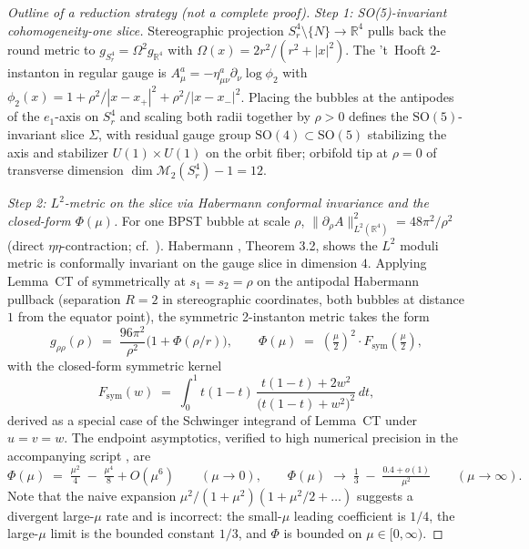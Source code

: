 \documentclass[11pt,letterpaper]{article}
\theoremstyle{definition}
\newcommand{\bbR}{\mathbb{R}}
\newcommand{\cM}{\mathcal{M}}
\begin{document}
\begin{proof}[Outline of a reduction strategy (not a complete proof)]
\emph{Step 1: SO(5)-invariant cohomogeneity-one slice.} Stereographic projection $S^4_r \setminus\{N\} \to \bbR^4$ pulls back the round metric to $g_{S^4_r} = \Omega^2 g_{\bbR^4}$ with $\Omega(x) = 2r^2/(r^2 + |x|^2)$. The 't~Hooft 2-instanton in regular gauge is $A^a_\mu = -\eta^a_{\mu\nu}\partial_\nu \log \phi_2$ with $\phi_2(x) = 1 + \rho^2/|x - x_+|^2 + \rho^2/|x - x_-|^2$. Placing the bubbles at the antipodes of the $e_1$-axis on $S^4_r$ and scaling both radii together by $\rho > 0$ defines the $\mathrm{SO}(5)$-invariant slice $\Sigma$, with residual gauge group $\mathrm{SO}(4) \subset \mathrm{SO}(5)$ stabilizing the axis and stabilizer $U(1) \times U(1)$ on the orbit fiber; orbifold tip at $\rho = 0$ of transverse dimension $\dim\cM_2(S^4_r) - 1 = 12$.

\emph{Step 2: $L^2$-metric on the slice via Habermann conformal invariance and the closed-form $\Phi(\mu)$.} For one BPST bubble at scale $\rho$, $\|\partial_\rho A\|^2_{L^2(\bbR^4)} = 48\pi^2/\rho^2$ (direct $\eta\eta$-contraction; cf.\ \cite{DK1990}). Habermann \cite{Habermann1993}, Theorem 3.2, shows the $L^2$ moduli metric is conformally invariant on the gauge slice in dimension $4$. Applying Lemma~CT of \cite{bonfioli-core} symmetrically at $s_1 = s_2 = \rho$ on the antipodal Habermann pullback (separation $R = 2$ in stereographic coordinates, both bubbles at distance $1$ from the equator point), the symmetric 2-instanton metric takes the form
\[
g_{\rho\rho}(\rho) \;=\; \frac{96\pi^2}{\rho^2}\bigl(1 + \Phi(\rho/r)\bigr),\qquad \Phi(\mu) \;=\; \left(\tfrac{\mu}{2}\right)^2 \cdot F_{\mathrm{sym}}\!\left(\tfrac{\mu}{2}\right),
\]
with the closed-form symmetric kernel
\[
F_{\mathrm{sym}}(w) \;=\; \int_0^1 t(1-t)\,\frac{t(1-t) + 2w^2}{\bigl(t(1-t) + w^2\bigr)^2}\,dt,
\]
derived as a special case of the Schwinger integrand of Lemma~CT under $u=v=w$. The endpoint asymptotics, verified to high numerical precision in the accompanying script \cite{m2-closure-higher-order}, are
\[
\Phi(\mu) \;=\; \tfrac{\mu^2}{4} \;-\; \tfrac{\mu^4}{8} + O(\mu^6)\qquad (\mu \to 0),\qquad
\Phi(\mu) \;\to\; \tfrac{1}{3}\;-\;\tfrac{0.4 + o(1)}{\mu^2}\qquad (\mu \to \infty).
\]
Note that the naive expansion $\mu^2/(1+\mu^2)(1+\mu^2/2 + \ldots)$ suggests a divergent large-$\mu$ rate and is incorrect: the small-$\mu$ leading coefficient is $1/4$, the large-$\mu$ limit is the bounded constant $1/3$, and $\Phi$ is bounded on $\mu \in [0,\infty)$.


\end{proof}
\end{document}
